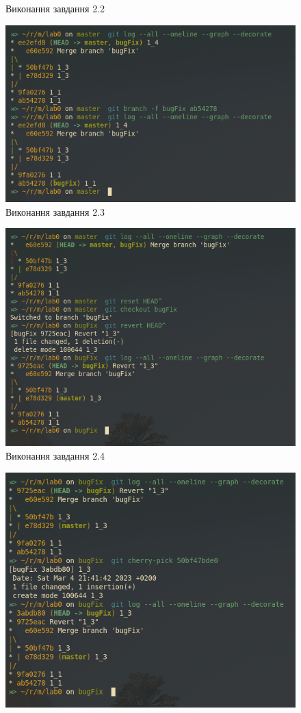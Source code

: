 \documentclass[oneside,14pt]{extarticle}
\begin{document}
\begin{normalsize}
\begin{figure}[H]
			\caption{Виконання завдання 2.2}
		\end{figure}
				\begin{figure}[H]
			\centering
			\includegraphics[scale=0.6]{2_3}
			\caption{Виконання завдання 2.3}
		\end{figure}
				\begin{figure}[H]
			\centering
			\includegraphics[scale=0.6]{2_4}
			\caption{Виконання завдання 2.4}
		\end{figure}
				\begin{figure}[H]
			\centering
			\includegraphics[scale=0.6]{3_1}

\end{figure}
\end{normalsize}
\end{document}
